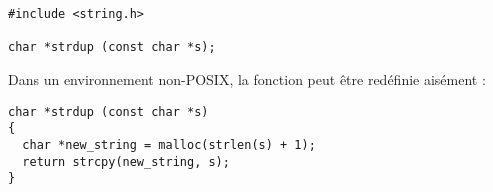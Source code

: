 \extrait
\begin{lstlisting}
#include <string.h>
  
char *strdup (const char *s);
\end{lstlisting}



Dans un environnement non-POSIX, la fonction peut être redéfinie aisément :


\source
\begin{lstlisting}
char *strdup (const char *s)
{
  char *new_string = malloc(strlen(s) + 1);
  return strcpy(new_string, s);
}
\end{lstlisting}

